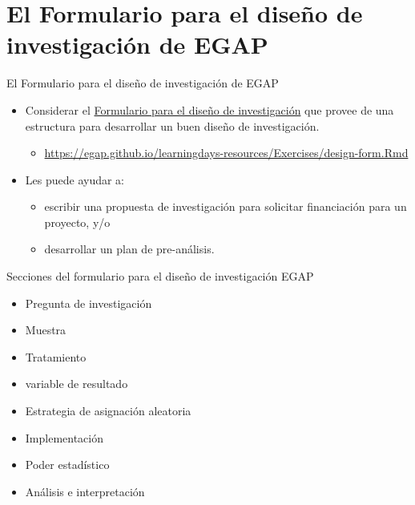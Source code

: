 \documentclass[
  ignorenonframetext,
]{beamer}
\providecommand{\tightlist}{%
  \setlength{\itemsep}{0pt}\setlength{\parskip}{0pt}}
\begin{document}
\hypertarget{el-formulario-para-el-diseuxf1o-de-investigaciuxf3n-de-egap}{%
\section{El Formulario para el diseño de investigación de
EGAP}\label{el-formulario-para-el-diseuxf1o-de-investigaciuxf3n-de-egap}}

\begin{frame}{El Formulario para el diseño de investigación de EGAP}
\protect\hypertarget{el-formulario-para-el-diseuxf1o-de-investigaciuxf3n-de-egap-1}{}
\begin{itemize}
\item
  Considerar el
  \href{https://egap.github.io/learningdays-resources/Exercises/design-form.Rmd}{Formulario
  para el diseño de investigación} que provee de una estructura para
  desarrollar un buen diseño de investigación.

  \begin{itemize}
  \tightlist
  \item
    \url{https://egap.github.io/learningdays-resources/Exercises/design-form.Rmd}
  \end{itemize}
\item
  Les puede ayudar a:

  \begin{itemize}
  \item
    escribir una propuesta de investigación para solicitar financiación
    para un proyecto, y/o
  \item
    desarrollar un plan de pre-análisis.
  \end{itemize}
\end{itemize}
\end{frame}

\begin{frame}{Secciones del formulario para el diseño de investigación
EGAP}
\protect\hypertarget{secciones-del-formulario-para-el-diseuxf1o-de-investigaciuxf3n-egap}{}
\begin{itemize}
\tightlist
\item
  Pregunta de investigación
\item
  Muestra
\item
  Tratamiento
\item
  variable de resultado
\item
  Estrategia de asignación aleatoria
\item
  Implementación
\item
  Poder estadístico
\item
  Análisis e interpretación
\end{itemize}
\end{frame}
\end{document}
